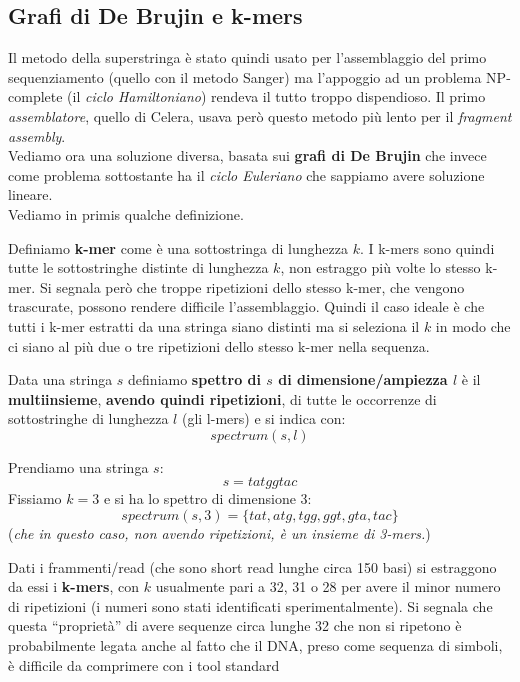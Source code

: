 \documentclass[a4paper,12pt, oneside]{book}
\begin{document}
\subsection{Grafi di De Brujin e k-mers}
Il metodo della superstringa è stato quindi usato per l'assemblaggio del primo
sequenziamento (quello con il metodo Sanger) ma l'appoggio ad un problema
NP-complete (il \textit{ciclo Hamiltoniano}) rendeva il tutto troppo
dispendioso. Il primo \textit{assemblatore}, quello di Celera, usava però questo
metodo più lento per il \textit{fragment assembly}.\\
Vediamo ora una soluzione diversa, basata sui \textbf{grafi di De Brujin} che
invece come problema sottostante ha il \textit{ciclo Euleriano} che sappiamo
avere soluzione lineare. \\
Vediamo in primis qualche definizione.
\begin{definizione}
  Definiamo \textbf{k-mer} come è una sottostringa di lunghezza
  $k$. I k-mers sono quindi tutte le sottostringhe distinte di lunghezza $k$,
  non estraggo più volte lo stesso k-mer. Si segnala però che troppe
  ripetizioni dello stesso k-mer, che vengono trascurate, possono rendere
  difficile l'assemblaggio. Quindi il caso ideale è che tutti i k-mer estratti
  da una stringa siano distinti ma si seleziona il $k$ in modo che ci siano al
  più due o tre ripetizioni dello stesso k-mer nella sequenza.
\end{definizione}
\begin{definizione}
  Data una stringa $s$ definiamo \textbf{spettro di $s$ di dimensione/ampiezza
    $l$} è il 
  \textbf{multiinsieme}, \textbf{avendo quindi ripetizioni}, di tutte le
  occorrenze di sottostringhe di lunghezza $l$ (gli l-mers) e si indica con:
  \[spectrum(s,l)\]
\end{definizione}
\begin{esempio}
  Prendiamo una stringa $s$:
  \[s=tatggtac\]
  Fissiamo $k=3$ e si ha lo spettro di dimensione $3$:
  \[spectrum(s,3)=\{tat, atg, tgg, ggt, gta, tac\}\]
  (\textit{che in questo caso, non avendo ripetizioni, è un insieme di 3-mers.})
\end{esempio}
Dati i frammenti/read (che sono short read lunghe circa 150 basi) si estraggono
da essi i \textbf{k-mers}, con $k$ usualmente pari a 32, 31 o 28 per avere il
minor numero di ripetizioni (i numeri sono stati identificati
sperimentalmente). Si segnala che questa ``proprietà'' di avere sequenze circa
lunghe 32 che non si ripetono è probabilmente legata anche al fatto che il DNA,
preso come sequenza di simboli, è difficile da comprimere con i tool standard
\end{document}
